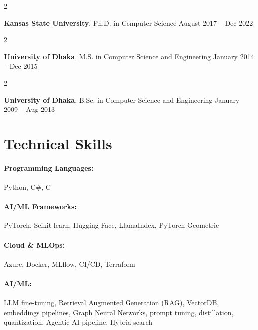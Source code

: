 \documentclass[10pt, letterpaper]{article}
\newenvironment{twocolentry}[2][]{
    \onecolentry
    \def\secondColumn{#2}
    \setcolumnwidth{\fill, 4.5 cm}
    \begin{paracol}{2}
}{
    \switchcolumn \raggedleft \secondColumn
    \end{paracol}
    \endonecolentry
} %
\begin{document}
        \begin{twocolentry}{
            August 2017 -- Dec 2022
        }
            \textbf{Kansas State University}, Ph.D. in Computer Science\end{twocolentry}

        \begin{twocolentry}{
            January 2014 -- Dec 2015
        }
            \textbf{University of Dhaka}, M.S. in Computer Science and Engineering\end{twocolentry}

        \begin{twocolentry}{
            January 2009 -- Aug 2013
        }
            \textbf{University of Dhaka}, B.Sc. in Computer Science and Engineering\end{twocolentry}

\vspace{-1mm}
\section{Technical Skills}

        \paragraph{Programming Languages:} Python, C\#, C
        \vspace{-4mm}
        \paragraph{AI/ML Frameworks:} PyTorch, Scikit-learn, Hugging Face, LlamaIndex, PyTorch Geometric
        \vspace{-4mm}
        \paragraph{Cloud \& MLOps:} Azure, Docker, MLflow, CI/CD, Terraform
        \vspace{-4mm}
        \paragraph{AI/ML:} LLM fine-tuning, Retrieval Augmented Generation (RAG), VectorDB, embeddings pipelines, Graph Neural Networks, prompt tuning, distillation, quantization, Agentic AI pipeline, Hybrid search
\end{document}
